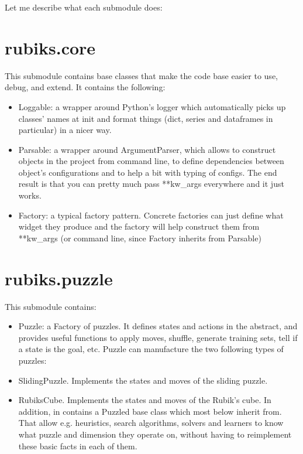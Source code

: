 Let me describe what each submodule does:

\section{rubiks.core}
This submodule contains base classes that make the code base easier to use, debug, and extend. It contains the following:
\begin{itemize}
\item Loggable: a wrapper around Python's logger which automatically picks up classes' names at init and format things (dict, series and dataframes in particular) in a nicer way.
\item Parsable: a wrapper around ArgumentParser, which allows to construct objects in the project from command line, to define dependencies between object's configurations and to help a bit with typing of configs. The end result is that you can pretty much pass **kw\_args everywhere and it just works.
\item Factory: a typical factory pattern. Concrete factories can just define what widget they produce and the factory will help construct them from **kw\_args (or command line, since Factory inherits from Parsable)
\end{itemize}

\section{rubiks.puzzle}
This submodule contains:
\begin{itemize}
\item Puzzle: a Factory of puzzles. It defines states and actions in the abstract, and provides useful functions to apply moves, shuffle, generate training sets, tell if a state is the goal, etc. Puzzle can manufacture the two following types of puzzles:
\item SlidingPuzzle. Implements the states and moves of the sliding puzzle.
\item RubiksCube. Implements the states and moves of the Rubik's cube.
In addition, in contains a Puzzled base class which most below inherit from. That allow e.g. heuristics, search algorithms, solvers and learners to know what puzzle and dimension they operate on, without having to reimplement these basic facts in each of them.
\end{itemize}

